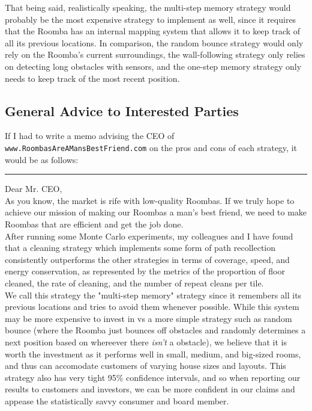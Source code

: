 \documentclass[11pt]{article}
\begin{document}
That being said, realistically speaking, the multi-step memory strategy
would probably be the most expensive strategy to implement as well,
since it requires that the Roomba has an internal mapping system that
allows it to keep track of all its previous locations. In comparison,
the random bounce strategy would only rely on the Roomba's current
surroundings, the wall-following strategy only relies on detecting long
obstacles with sensors, and the one-step memory strategy only needs to
keep track of the most recent position.
\newpage
\subsection{General Advice to Interested Parties}

If I had to write a memo advising the CEO of \\\texttt{www.RoombasAreAMansBestFriend.com} on the pros and cons of each strategy, it would be as follows:

\rule{\textwidth}{0.4pt}

Dear Mr. CEO,\\

As you know, the market is rife with low-quality Roombas. If we truly
hope to achieve our mission of making our Roombas a man's best friend,
we need to make Roombas that are efficient and get the job done.\\

After running some Monte Carlo experiments, my colleagues and I have
found that a cleaning strategy which implements some form of path
recollection consistently outperforms the other strategies in terms of
coverage, speed, and energy conservation, as represented by the metrics
of the proportion of floor cleaned, the rate of cleaning, and the number
of repeat cleans per tile.\\

We call this strategy the "multi-step memory" strategy since it
remembers all its previous locations and tries to avoid them whenever
possible. While this system may be more expensive to invest in vs a more
simple strategy such as random bounce (where the Roomba just bounces off
obstacles and randomly determines a next position based on whereever
there \emph{isn't} a obstacle), we believe that it is worth the
investment as it performs well in small, medium, and big-sized rooms,
and thus can accomodate customers of varying house sizes and layouts.
This strategy also has very tight 95\% confidence intervals, and so when
reporting our results to customers and investors, we can be more
confident in our claims and appease the statistically savvy consumer and
board member.\\
\end{document}
